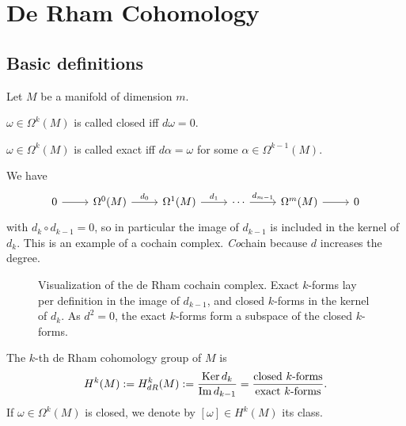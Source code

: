 
\setcounter{chapter}{6}
\chapter{De Rham Cohomology}
\section{Basic definitions}

Let $M$ be a manifold of dimension $m$.


\begin{definition}
    $\omega \in \Omega^{k}(M)$ is called closed iff $d \omega = 0$.
\end{definition}
\begin{definition}
    $\omega \in \Omega^{k}(M)$ is called exact iff $d \alpha = \omega$ for some $\alpha\in \Omega^{k-1}(M)$.
\end{definition}

We have
\[
    \begin{tikzcd}
        0 \arrow[r, ""] 
        &\Omega^{0}(M) \arrow[r, "d_0"] &
        \Omega^{1}(M) \arrow[r, "d_1"]
        &\cdots \arrow[r, "d_{m-1}"]
        &\Omega ^{m}(M) \arrow[r, ""]
        &0
    \end{tikzcd}
\]
with $d_k  \circ  d_{k-1} = 0$,
so in particular  the image of $d_{k-1}$ is included in the kernel of $d_k$.
This is an example of a cochain complex.
\emph{Co}chain because $d$ increases the degree.

\begin{figure}[H]
    \centering
    \caption{
        Visualization of the de Rham cochain complex.
        Exact $k$-forms lay per definition in the image of $d_{k-1}$, and closed $k$-forms in the kernel of $d_k$.
        As $d^2 = 0$, the exact $k$-forms form a subspace of the closed $k$-forms.
    }
    \label{fig:rham-cohomology}
\end{figure}

\begin{definition}
    The $k$-th de Rham cohomology group of $M$ is 
    \[
        H^{k}(M) := H^{k}_{dR}(M) := \frac{\operatorname{Ker} d_k}{\operatorname{Im} d_{k-1}} = \frac{\text{closed $k$-forms}}{\text{exact $k$-forms}}
    .\] 
    If $\omega \in \Omega^{k}(M)$ is closed, we denote by $[\omega] \in  H^{k}(M)$ its class.
\end{definition}

